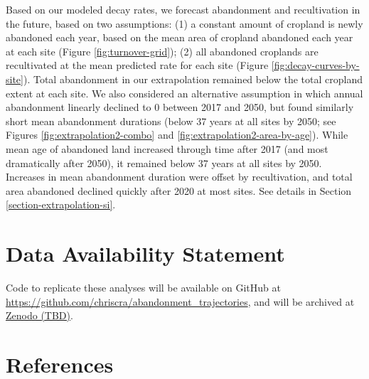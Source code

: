 \documentclass[9pt,twocolumn,twoside,]{pnas-new}
\begin{document}
Based on our modeled decay rates, we forecast abandonment and recultivation in the future, based on two assumptions: (1) a constant amount of cropland is newly abandoned each year, based on the mean area of cropland abandoned each year at each site (Figure \ref{fig:turnover-grid}); (2) all abandoned croplands are recultivated at the mean predicted rate for each site (Figure \ref{fig:decay-curves-by-site}).
Total abandonment in our extrapolation remained below the total cropland extent at each site.
We also considered an alternative assumption in which annual abandonment linearly declined to 0 between 2017 and 2050, but found similarly short mean abandonment durations (below 37 years at all sites by 2050; see Figures \ref{fig:extrapolation2-combo} and \ref{fig:extrapolation2-area-by-age}).
While mean age of abandoned land increased through time after 2017 (and most dramatically after 2050), it remained below 37 years at all sites by 2050.
Increases in mean abandonment duration were offset by recultivation, and total area abandoned declined quickly after 2020 at most sites.
See details in Section \ref{section-extrapolation-si}.

\hypertarget{data-availability-statement}{%
\section{Data Availability Statement}\label{data-availability-statement}}

Code to replicate these analyses will be available on GitHub at \url{https://github.com/chriscra/abandonment_trajectories}, and will be archived at \href{https://doi.org/}{Zenodo (TBD)}.

\showacknow

\newpage

\hypertarget{references}{%
\section{References}\label{references}}
\end{document}
